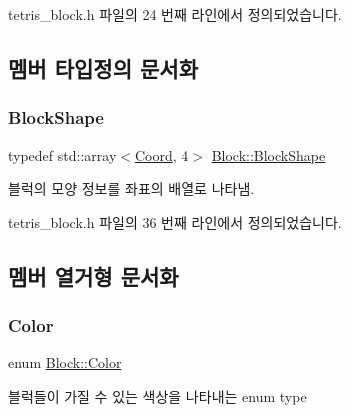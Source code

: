 tetris\+\_\+block.\+h 파일의 24 번째 라인에서 정의되었습니다.



\subsection{멤버 타입정의 문서화}
\mbox{\label{class_block_aca5d951639f113e2ebd7856209d6b9ab}} 
\subsubsection{\texorpdfstring{Block\+Shape}{BlockShape}}
{\footnotesize\ttfamily typedef std\+::array$<$\mbox{\hyperlink{struct_coord}{Coord}}, 4$>$ \mbox{\hyperlink{class_block_aca5d951639f113e2ebd7856209d6b9ab}{Block\+::\+Block\+Shape}}}



블럭의 모양 정보를 좌표의 배열로 나타냄. 



tetris\+\_\+block.\+h 파일의 36 번째 라인에서 정의되었습니다.



\subsection{멤버 열거형 문서화}
\mbox{\label{class_block_ad054b4ac51df79aa910040b2a2fdf7b5}} 
\subsubsection{\texorpdfstring{Color}{Color}}
{\footnotesize\ttfamily enum \mbox{\hyperlink{class_block_ad054b4ac51df79aa910040b2a2fdf7b5}{Block\+::\+Color}}}



블럭들이 가질 수 있는 색상을 나타내는 enum type 

